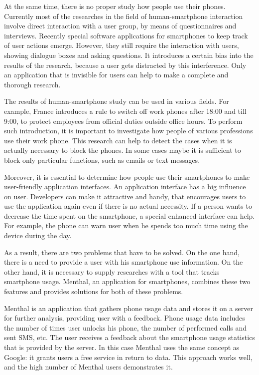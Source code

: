 At the same time, there is no proper study how people use their phones.
Currently most of the researches in the field of human-smartphone interaction involve direct interaction with a user group, by means of questionnaires and interviews.
Recently special software applications for smartphones to keep track of user actions emerge.
However, they still require the interaction with users, showing dialogue boxes and asking questions.
It introduces a certain bias into the results of the research, because a user gets distracted by this interference.
Only an application that is invisible for users can help to make a complete and thorough research.

The results of human-smartphone study can be used in various fields.
For example, France introduces a rule to switch off work phones after 18:00 and till 9:00, to protect employees from official duties outside office hours.
To perform such introduction, it is important to investigate how people of various professions use their work phone.
This research can help to detect the cases when it is actually necessary to block the phones.
In some cases maybe it is sufficient to block only particular functions, such as emails or text messages.

Moreover, it is essential to determine how people use their smartphones to make user-friendly application interfaces. 
An application interface has a big influence on user.
Developers can make it attractive and handy, that encourages users to use the application again even if there is no actual necessity.
If a person wants to decrease the time spent on the smartphone, a special enhanced interface can help.
For example, the phone can warn user when he spends too much time using the device during the day.  

As a result, there are two problems that have to be solved. 
On the one hand, there is a need to provide a user with his smartphone use information.
On the other hand, it is necessary to supply researches with a tool that tracks smartphone usage.
Menthal, an application for smartphones, combines these two features and provides solutions for both of these problems. 

Menthal is an application that gathers phone usage data and stores it on a server for further analysis, providing user with a feedback.
Phone usage data includes the number of times user unlocks his phone, the number of performed calls and sent SMS, etc.
The user receives a feedback about the smartphone usage statistics that is provided by the server.
In this case Menthal uses the same concept as Google: it grants users a free service in return to data.
This approach works well, and the high number of Menthal users demonstrates it. 

